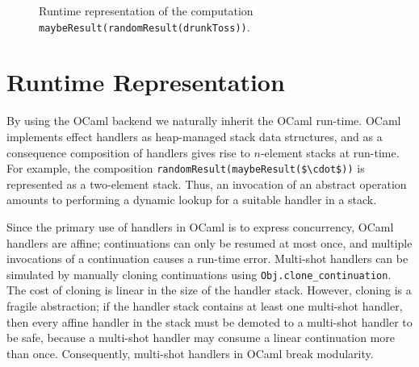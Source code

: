 \documentclass[mscres,cdtppar,twoside,openright,logo,rightchapter,normalheadings]{infthesis}
\theoremstyle{definition}
\begin{document}
\begin{figure}
\centering
{}
\caption{Runtime representation of the computation \lstinline$maybeResult(randomResult(drunkToss))$.}\label{fig:rtstack}
\end{figure}

\section{Runtime Representation}
By using the OCaml backend we naturally inherit the OCaml
run-time. OCaml implements effect handlers as heap-managed stack data
structures, and as a consequence composition of handlers gives rise to
$n$-element stacks at run-time. For example, the composition
\lstinline[mathescape]!randomResult(maybeResult($\cdot$))! is
represented as a two-element stack. Thus, an invocation of an abstract
operation amounts to performing a dynamic lookup for a suitable
handler in a stack.

Since the primary use of handlers in OCaml is to express concurrency,
OCaml handlers are affine; continuations can only be resumed at most
once, and multiple invocations of a continuation causes a run-time
error. Multi-shot handlers can be simulated by manually cloning
continuations using \lstinline$Obj.clone_continuation$. The cost of
cloning is linear in the size of the handler stack. However, cloning
is a fragile abstraction; if the handler stack contains at least one
multi-shot handler, then every affine handler in the stack must be
demoted to a multi-shot handler to be safe, because a multi-shot
handler may consume a linear continuation more than
once. Consequently, multi-shot handlers in OCaml break modularity.
\end{document}

